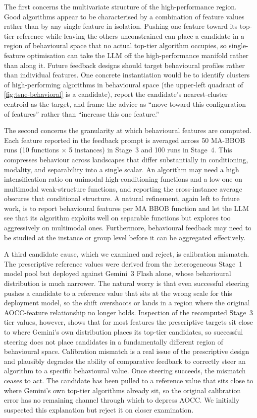 The first concerns the multivariate structure of the high-performance region. Good algorithms appear to be characterised by a combination of feature values rather than by any single feature in isolation. Pushing one feature toward its top-tier reference while leaving the others unconstrained can place a candidate in a region of behavioural space that no actual top-tier algorithm occupies, so single-feature optimisation can take the LLM off the high-performance manifold rather than along it. Future feedback designs should target behavioural profiles rather than individual features. One concrete instantiation would be to identify clusters of high-performing algorithms in behavioural space (the upper-left quadrant of \cref{fig:tsne-behavioral} is a candidate), report the candidate's nearest-cluster centroid as the target, and frame the advice as ``move toward this configuration of features'' rather than ``increase this one feature.''

The second concerns the granularity at which behavioural features are computed. Each feature reported in the feedback prompt is averaged across 50 MA-BBOB runs (10 functions $\times$ 5 instances) in Stage~3 and 100 runs in Stage~4. This compresses behaviour across landscapes that differ substantially in conditioning, modality, and separability into a single scalar. An algorithm may need a high intensification ratio on unimodal high-conditioning functions and a low one on multimodal weak-structure functions, and reporting the cross-instance average obscures that conditional structure. A natural refinement, again left to future work, is to report behavioural features per MA BBOB function and let the LLM see that its algorithm exploits well on separable functions but explores too aggressively on multimodal ones. Furthermore, behavioural feedback may need to be studied at the instance or group level before it can be aggregated effectively.

A third candidate cause, which we examined and reject, is calibration mismatch. The prescriptive reference values were derived from the heterogeneous Stage~1 model pool but deployed against Gemini~3 Flash alone, whose behavioural distribution is much narrower. The natural worry is that even successful steering pushes a candidate to a reference value that sits at the wrong scale for this deployment model, so the shift overshoots or lands in a region where the original AOCC-feature relationship no longer holds. Inspection of the recomputed Stage~3 tier values, however, shows that for most features the prescriptive targets sit close to where Gemini's own distribution places its top-tier candidates, so successful steering does not place candidates in a fundamentally different region of behavioural space. Calibration mismatch is a real issue of the prescriptive design and plausibly degrades the ability of comparative feedback to correctly steer an algorithm to a specific behavioural value. Once steering succeeds, the mismatch ceases to act. The candidate has been pulled to a reference value that sits close to where Gemini's own top-tier algorithms already sit, so the original calibration error has no remaining channel through which to depress AOCC. We initially suspected this explanation but reject it on closer examination.

